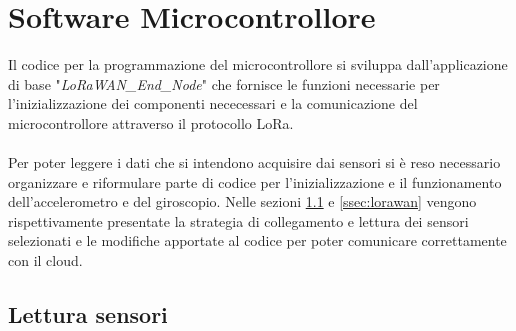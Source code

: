 \section{Software Microcontrollore}
Il codice per la programmazione del microcontrollore si sviluppa dall'applicazione di base "\textit{LoRaWAN\_End\_Node}" che fornisce
le funzioni necessarie per l'inizializzazione dei componenti nececessari e la comunicazione del microcontrollore attraverso il protocollo LoRa.
\\\\Per poter leggere i dati che si intendono acquisire dai sensori si è reso necessario organizzare e riformulare parte di codice per l'inizializzazione e il funzionamento dell'accelerometro
e del giroscopio. Nelle sezioni \ref{ssec:sensori} e \ref{ssec:lorawan} vengono rispettivamente presentate la strategia di collegamento e lettura dei sensori selezionati e 
le modifiche apportate al codice per poter comunicare correttamente con il cloud.

\subsection{Lettura sensori}\label{ssec:sensori}

